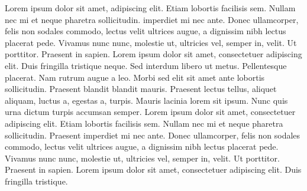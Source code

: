 \documentclass{memoir}
\begin{document}
\beginnumbering
\pstart
Lorem ipsum dolor sit amet,  adipiscing elit. Etiam
lobortis facilisis sem. Nullam nec mi et neque pharetra
sollicitudin.  imperdiet mi nec ante. Donec ullamcorper,
felis non sodales commodo, lectus velit ultrices augue, a
dignissim nibh lectus placerat pede. Vivamus nunc nunc, molestie
ut, ultricies vel, semper in, velit. Ut porttitor. Praesent in
sapien. Lorem ipsum dolor sit amet, consectetuer adipiscing elit.
Duis fringilla tristique neque. Sed interdum libero ut metus.
Pellentesque placerat. Nam rutrum augue a leo. Morbi sed elit sit
amet ante lobortis sollicitudin. Praesent blandit blandit mauris.
Praesent lectus tellus, aliquet aliquam, luctus a, egestas a,
turpis. Mauris lacinia lorem sit  ipsum. Nunc quis urna dictum
turpis accumsan semper.
\pend
\pstart
Lorem ipsum dolor sit amet, consectetuer adipiscing elit. Etiam
lobortis facilisis sem. Nullam nec mi et neque pharetra
sollicitudin. Praesent imperdiet mi nec ante. Donec ullamcorper,
felis non sodales commodo, lectus velit ultrices augue, a
dignissim nibh lectus placerat pede. Vivamus nunc nunc, molestie
ut, ultricies vel, semper in, velit. Ut porttitor. Praesent in
sapien. Lorem ipsum dolor sit amet, consectetuer adipiscing elit.
Duis fringilla tristique. 
\pend
\endnumbering
\printindex[bibel]
\end{document}
